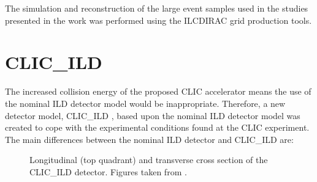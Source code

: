 The simulation and reconstruction of the large event samples used in the studies presented in the work was performed using the ILCDIRAC \cite{Grefe:2014sca, Tsaregorodtsev:2008zz} grid production tools.  


\section{CLIC\_ILD}
The increased collision energy of the proposed CLIC accelerator means the use of the nominal ILD detector model would be inappropriate.  Therefore, a new detector model, CLIC\_ILD \cite{Linssen:2012hp,AlipourTehrani:2254048}, based upon the nominal ILD detector model was created to cope with the experimental conditions found at the CLIC experiment.  The main differences between the nominal ILD detector and CLIC\_ILD are:

\begin{figure}[h!]
\centering
{}
\hspace{1cm}
\caption[\protect{} Longitudinal (top quadrant) and \protect{} transverse cross section of the CLIC\_ILD detector.  Figures taken from \cite{Linssen:2012hp}.]{\protect{} Longitudinal (top quadrant) and \protect{} transverse cross section of the CLIC\_ILD detector.  Figures taken from \cite{Linssen:2012hp}.}
\label{fig:clicild}
\end{figure} 

